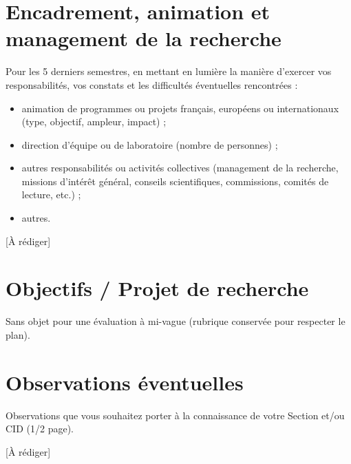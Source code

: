 \documentclass[10pt,a4paper]{article}
\newcommand{\arediger}{\textcolor{gris}{[À rédiger]}}
\begin{document}
\section{Encadrement, animation et management de la recherche}
\begin{consigne}
Pour les 5 derniers semestres, en mettant en lumière la manière d'exercer vos responsabilités, vos constats et les difficultés éventuelles rencontrées :
\begin{itemize}
  \item animation de programmes ou projets français, européens ou internationaux (type, objectif, ampleur, impact) ;
  \item direction d'équipe ou de laboratoire (nombre de personnes) ;
  \item autres responsabilités ou activités collectives (management de la recherche, missions d'intérêt général, conseils scientifiques, commissions, comités de lecture, etc.) ;
  \item autres.
\end{itemize}
\end{consigne}
\arediger %

\section{Objectifs / Projet de recherche}
Sans objet pour une évaluation à mi-vague (rubrique conservée pour respecter le plan).

\section{Observations éventuelles}
\begin{consigne}
Observations que vous souhaitez porter à la connaissance de votre Section et/ou CID (1/2 page).
\end{consigne}
\arediger %
\end{document}
